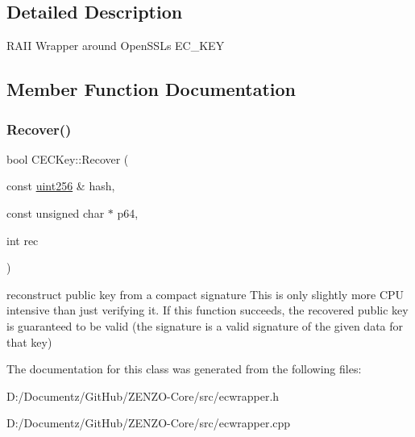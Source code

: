 \subsection{Detailed Description}
R\+A\+II Wrapper around Open\+S\+SL\textquotesingle{}s E\+C\+\_\+\+K\+EY 

\subsection{Member Function Documentation}
\mbox{\label{class_c_e_c_key_a5d7ed3acdc6c2798af3242cacc7b755b}} 
\subsubsection{\texorpdfstring{Recover()}{Recover()}}
{\footnotesize\ttfamily bool C\+E\+C\+Key\+::\+Recover (\begin{DoxyParamCaption}\item[{const \mbox{\hyperlink{classuint256}{uint256}} \&}]{hash,  }\item[{const unsigned char $\ast$}]{p64,  }\item[{int}]{rec }\end{DoxyParamCaption})}

reconstruct public key from a compact signature This is only slightly more C\+PU intensive than just verifying it. If this function succeeds, the recovered public key is guaranteed to be valid (the signature is a valid signature of the given data for that key) 

The documentation for this class was generated from the following files\+:\begin{DoxyCompactItemize}
\item 
D\+:/\+Documentz/\+Git\+Hub/\+Z\+E\+N\+Z\+O-\/\+Core/src/ecwrapper.\+h\item 
D\+:/\+Documentz/\+Git\+Hub/\+Z\+E\+N\+Z\+O-\/\+Core/src/ecwrapper.\+cpp\end{DoxyCompactItemize}
